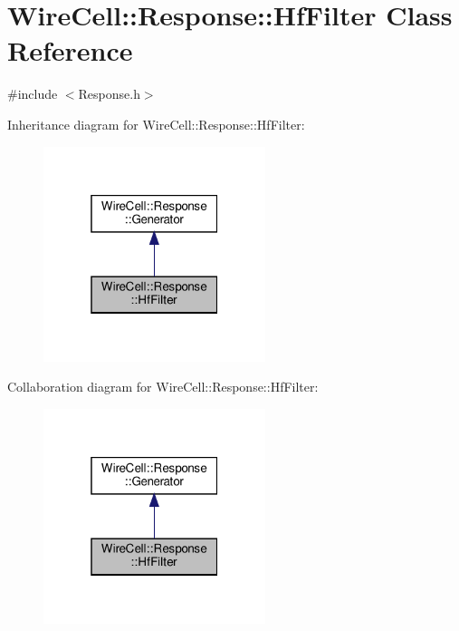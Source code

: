 \hypertarget{class_wire_cell_1_1_response_1_1_hf_filter}{}\section{Wire\+Cell\+:\+:Response\+:\+:Hf\+Filter Class Reference}
\label{class_wire_cell_1_1_response_1_1_hf_filter}


{\ttfamily \#include $<$Response.\+h$>$}



Inheritance diagram for Wire\+Cell\+:\+:Response\+:\+:Hf\+Filter\+:
\nopagebreak
\begin{figure}[H]
\begin{center}
\leavevmode
\includegraphics[width=184pt]{class_wire_cell_1_1_response_1_1_hf_filter__inherit__graph}
\end{center}
\end{figure}


Collaboration diagram for Wire\+Cell\+:\+:Response\+:\+:Hf\+Filter\+:
\nopagebreak
\begin{figure}[H]
\begin{center}
\leavevmode
\includegraphics[width=184pt]{class_wire_cell_1_1_response_1_1_hf_filter__coll__graph}
\end{center}
\end{figure}
